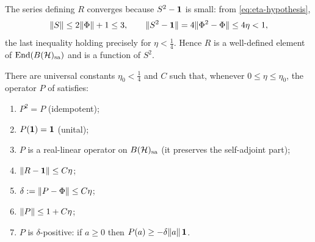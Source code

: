 The series defining $R$ converges because $S^2-\mathbf{1}$ is small: from
\eqref{eq:eta-hypothesis},
\begin{equation}\label{eq:S2-bound}
  \lVert S \rVert\le 2\lVert \Phi \rVert+1\le 3,\qquad
  \lVert S^2-\mathbf{1} \rVert=4\lVert \Phi^2-\Phi \rVert\le 4\eta<1,
\end{equation}
the last inequality holding precisely for $\eta<\tfrac14$. Hence $R$ is a
well-defined element of $\mathrm{End}(B(\mathcal{H})_{\mathrm{sa}})$ and is a function of $S^2$.

\begin{lemma}\label{lem:P-properties}
There are universal constants $\eta_0<\tfrac14$ and $C$ such that, whenever
$0\le\eta\le\eta_0$, the operator $P$ of 
satisfies:
\begin{enumerate}[label=\textup{(\roman*)}]
  \item $P^2=P$ \textup{(idempotent)};
  \item $P(\mathbf{1})=\mathbf{1}$ \textup{(unital)};
  \item $P$ is a real-linear operator on $B(\mathcal{H})_{\mathrm{sa}}$ \textup{(it preserves the
        self-adjoint part)};
  \item $\lVert R-\mathbf{1} \rVert\le C\eta$;
  \item $\delta:=\lVert P-\Phi \rVert\le C\eta$;
  \item $\lVert P \rVert\le 1+C\eta$;
  \item $P$ is $\delta$-positive: if $a\ge 0$ then
        $P(a)\ge-\delta\lVert a \rVert\,\mathbf{1}$.
\end{enumerate}
\end{lemma}


